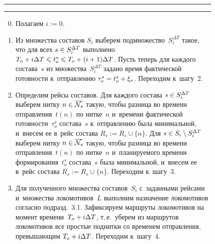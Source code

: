 \begin{multicols}{2}
\renewcommand{\figurename}{\protect\bf Алгоритм}

\begin{figure*}[b] %
\hrule

\vspace*{-4pt}

\Caption{\ }  

\vspace*{3pt}  
\hrule

\vspace*{2pt}

    \begin{enumerate}[1.]
        \setcounter{enumi}{-1}

        \item
        Полагаем $i := 0$.

        \item
        Из множества составов $S_i$ выберем подмножество~$S_i^{\Delta T}$ 
        такое, что для всех $s \hm\in S_i^{\Delta T}$
        выполнено $T_o \hm+ i\Delta T \leqslant t^s_o \hm\leqslant T_o \hm+ 
        (i+1)\Delta T$. Пусть теперь для каждого состава~$s$
        из множества~$S_i^{\Delta T}$ задано время фактической готовности 
        к~отправлению $\tau^s_o \hm= t^s_o \hm+ \xi_s$. Переходим к~шагу~2.

        \item
        Определим рейсы составов. Для каждого состава $s \hm\in S_i^{\Delta T}$ 
        выберем нитку $n \hm\in \overline{\mathcal N_s}$ такую,
        чтобы разница во времени отправления~$t(n)$ по нитке~$n$ 
        и~времени фактической готовности~$\tau_o^s$ состава~$s$
        к~отправлению была минимальной, и~внесем ее в~рейс состава 
        $R_s := R_s \cup \{n\}$.
        Для $s \hm\in S_i \setminus S_i^{\Delta T}$ выберем нитку 
        $n \hm\in \overline{\mathcal N_s}$ такую, чтобы разница
        во времени отправления~$t(n)$ по нитке~$n$ и~планируемого времени 
        формирования~$t_o^s$  состава~$s$ была минимальной,
        и~внесем ее в~рейс состава $R_s := R_s \cup \{n\}$. Переходим к~шагу~3.

        \item
        Для полученного множества составов~$S_i$ с~заданными рейсами 
        и~множества локомотивов~$L$ выполним назначение локомотивов согласно
         подразд.~3.1. Зафиксируем маршруты локомотивов на момент времени~$T_o \hm+ 
         i\Delta T$, т.\,е.\ уберем из маршрутов локомотивов все простые поднитки
          со временем отправления, превышающим $T_o \hm+ i\Delta T$. Переходим к~шагу~4.


\end{enumerate}
\end{figure*}
\end{multicols}
